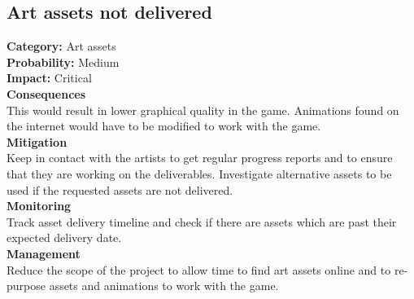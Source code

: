 \documentclass[a4paper,10pt]{article}
\begin{document}
		\subsection{Art assets not delivered}
		\textbf{Category:} Art assets\\
		\textbf{Probability:} Medium\\
		\textbf{Impact:} Critical
		\\\textbf{Consequences}\\
		This would result in lower graphical quality in the game.
		Animations found on the internet would have to be modified to work with the game.
		\smallskip\\\textbf{Mitigation}\\
		Keep in contact with the artists to get regular progress reports and to ensure that they are working on the deliverables. Investigate alternative assets to be used if the requested assets are not delivered.
		\smallskip\\\textbf{Monitoring}\\
		Track asset delivery timeline and check if there are assets which are past their expected delivery date.
		\smallskip\\\textbf{Management}\\
		Reduce the scope of the project to allow time to find art assets online and to re-purpose assets and animations to work with the game.
\end{document}

